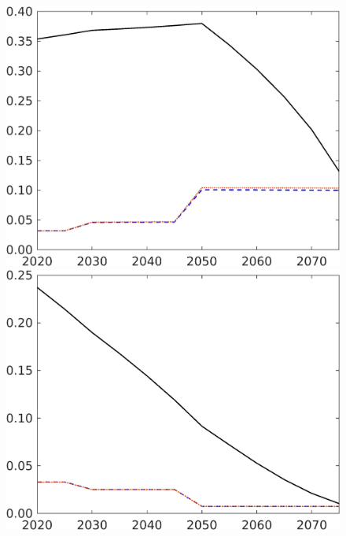 \begin{figure}[h!!]
\begin{minipage}[]{0.32\textwidth}
	\end{minipage}
	\begin{minipage}[]{0.32\textwidth}
		\includegraphics[width=1\textwidth]{../../codding_model/own_basedOnFried/optimalPol_elastS_DisuSci/figures/all_1705/sg_CompEffOPT_T_NoTaus_spillover0_sep1_BN0_ineq0_etaa0.79_lgd0.png}
	\end{minipage}
	\begin{minipage}[]{0.32\textwidth}
		\includegraphics[width=1\textwidth]{../../codding_model/own_basedOnFried/optimalPol_elastS_DisuSci/figures/all_1705/sff_CompEffOPT_T_NoTaus_spillover0_sep1_BN0_ineq0_etaa0.79_lgd0.png}

\end{minipage}
\end{figure}
